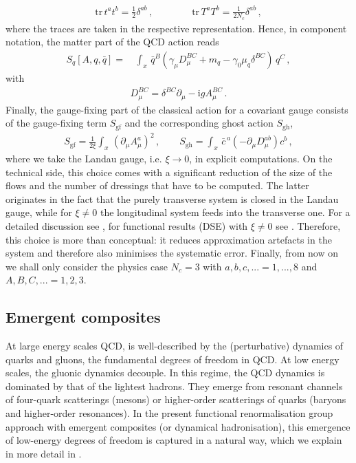 \documentclass[aps,twocolumn,prd,superscriptaddress]{revtex4-2}
\begin{document}
%
\begin{align}
	{\textrm{tr}}\,t^a t^b = \frac12  \delta^{ab}\,,\qquad \qquad  {\textrm{tr}} \,T^a T^b = \frac{1}{2N_c}  \delta^{ab}\,,
	\label{eq:LieNorm}
\end{align}
%
where the traces are taken in the respective representation. 
Hence, in component notation, the matter part of the QCD action reads 
%
\begin{align} 
	S_q [A,q,\bar q]  = & \, \int_x \,\bar q^B  \left( \gamma_\mu D^{BC}_\mu+m_q-\gamma_0 \mu_q\delta^{BC}  \right)\,q^C \,,  
	\label{eq:SqComponents} 
\end{align}
%
with 
%
\begin{align}
D_\mu^{BC} = \delta^{BC} \partial_\mu - {\textrm{i}} g A^{BC}_\mu \,.
\end{align}
%
Finally, the gauge-fixing part of the classical action for a covariant gauge consists of the gauge-fixing term $S_\textrm{gf}$ and the corresponding ghost action $S_\textrm{gh}$,
%
\begin{align}
	S_\textrm{gf}= \frac{1}{2\xi} \int_x\, (\partial_\mu A_\mu^a)^2 \,,\qquad  S_\textrm{gh}=	\int_x \, \bar c^{\,a}\left(-\partial_\mu D_\mu^{ab}\right) c^b \,,
	\label{eq:Sgauge}
\end{align}
%
where we take the Landau gauge, i.e. $\xi\to 0$, in explicit computations. On the technical side, this choice comes with a significant reduction of the size of the flows and the number of dressings that have to be computed. The latter originates in the fact that the purely transverse system is closed in the Landau gauge, while for $\xi\neq 0$ the longitudinal system feeds into the transverse one. For a detailed discussion see \cite{Fischer:2008uz, Cyrol:2016tym, Dupuis:2020fhh, Pawlowski:2022oyq}, for functional results (DSE) with $\xi\neq 0$ see \cite{Aguilar:2015nqa, Huber:2015ria, Napetschnig:2021ria}. Therefore, this choice is more than conceptual: it reduces approximation artefacts in the system and therefore also minimises the systematic error. Finally, from now on we shall only consider the physics case $N_c=3$ with $a,b,c,...=1,...,8$ and $A,B,C,...=1,2,3$. 


\subsection{Emergent composites} 
\label{sec:EmergentCompositesAction}

At large energy scales QCD, is well-described by the (perturbative) dynamics of quarks and gluons, the fundamental degrees of freedom in QCD. At low energy scales, the gluonic dynamics decouple. In this regime, the QCD dynamics is dominated by that of the lightest hadrons. They emerge from resonant channels of four-quark scatterings (mesons) or higher-order scatterings of quarks (baryons and higher-order resonances). In the present functional renormalisation group approach with emergent composites (or dynamical hadronisation), this emergence of low-energy degrees of freedom is captured in a natural way, which we explain in more detail in .
\end{document}
